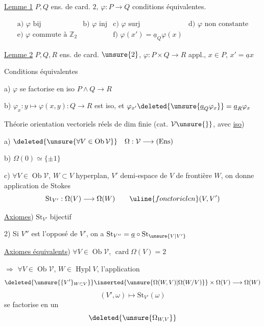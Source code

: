 \uline{Lemme 1} $P,Q$ ens. de card. $2$, $\varphi:P\longrightarrow Q$ conditions équivalentes.

\[
\begin{array}{llll}
\text{a) }\varphi\text{ bij}&\text{b) }\varphi\text{ inj}&\text{c) }\varphi\text{ surj}&\text{d) }\varphi\text{ non constante}\\
\text{e) }\varphi\text{ commute à }\mathbb{Z}_2&&\text{f) }\varphi(x')=\underline a_Q\varphi(x)
\end{array}
\]

\uline{Lemme 2} $P,Q,R$ ens. de card. $\unsure{2}$, $\varphi:P\times Q\longrightarrow R$ appl., $x\in P$, $x'=\underline a x$

Conditions équivalentes

a) $\varphi$ se factorise en iso $P\wedge Q\longrightarrow R$

b) $\varphi_x:y\longmapsto\varphi(x,y):Q\longrightarrow R$ est iso, et $\varphi_{x'}\deleted{\unsure{\underline a_Q\varphi_x}}=\underline a_R\varphi_x$

Théorie orientation  vectoriels réels de dim finie (cat. $\mathcal V\unsure{\}}$, avec \uline{iso})

a) $\deleted{\unsure{\forall V\in\operatorname{Ob}\mathcal V}}\quad\Omega:\mathcal V\longrightarrow(\mathrm{Ens})$

b) $\Omega(0)\simeq\{\pm1\}$

c) $\forall V\in\operatorname{Ob}\mathcal V$, $W\subset V$ hyperplan, $V'$ demi-espace de $V$ de frontière $W$, on donne application de Stokes
\[
\mathrm{St}_{V'}:\Omega(V)\longrightarrow\Omega(W)\qquad\uline{fonctoriel en }(V,V')
\]

\uline{Axiomes}) $\mathrm{St}_{V'}$ bijectif 


2) Si $V''$ est l'opposé de $V'$, on a $\mathrm{St}_{V''}=\underline a\circ\mathrm{St}_{\unsure{V|V'}}$

\uline{Axiomes équivalents}) $\forall V\in\operatorname{Ob}\mathcal V$, $\operatorname{card}\Omega(V)=2$

$\Rightarrow$ $\forall V\in\operatorname{Ob}\mathcal V$, $W\in\operatorname{Hypl}V$,  l'application
\[
\deleted{\unsure{\{V'\}_{W\subset V}}}\inserted{\unsure{\Omega(W,V)|\Omega(W/V)}}\times\Omega(V)\longrightarrow\Omega(W)
\]
\[
(V',\omega)\longmapsto\mathrm{St}_{V'}(\omega)
\]
se factorise en un  
\[
\deleted{\unsure{\Omega_{W,V}}}
\]

